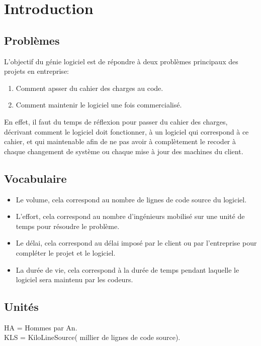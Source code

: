 \section{Introduction}
\subsection{Problèmes}
L'objectif du génie logiciel est de répondre à deux problèmes principaux des projets en entreprise:
\begin{enumerate}
	\item Comment apsser du cahier des charges au code.
	\item Comment maintenir le logiciel une fois commercialisé.
\end{enumerate}

En effet, il faut du temps de réflexion pour passer du cahier des charges, décrivant comment le logiciel
doit fonctionner, à un logiciel qui correspond à ce cahier, et qui maintenable afin de ne pas avoir à
complètement le recoder à chaque changement de système ou chaque mise à jour des machines du client.

\subsection{Vocabulaire}
\begin{itemize}
	\item Le volume, cela correspond au nombre de lignes de code source du logiciel.
	\item L'effort, cela correspond au nombre d'ingénieurs mobilisé sur une unité de temps pour résoudre le
	problème.
	\item Le délai, cela correspond au délai imposé par le client ou par l'entreprise pour compléter le projet et
	le logiciel.
	\item La durée de vie, cela correspond à la durée de temps pendant laquelle le logiciel sera maintenu par
	les codeurs.
\end{itemize}

\subsection{Unités}
HA = Hommes par An.\\
KLS = KiloLineSource( millier de lignes de code source).
